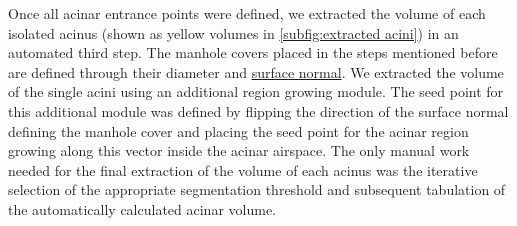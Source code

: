 \documentclass[twoside,paper=a4,abstract=true,english,DIV=calc]{scrartcl}
\begin{document}
Once all acinar entrance points were defined, we extracted the volume of each isolated acinus (shown as yellow volumes in \autoref{subfig:extracted acini}) in an automated third step.
The manhole covers placed in the steps mentioned before are defined through their diameter and \href{https://secure.wikimedia.org/wikipedia/en/w/index.php?title=Surface_normal&oldid=411684319}{surface normal}.
We extracted the volume of the single acini using an additional region growing module.
The seed point for this additional module was defined by flipping the direction of the surface normal defining the manhole cover and placing the seed point for the acinar region growing along this vector inside the acinar airspace.
The only manual work needed for the final extraction of the volume of each acinus was the iterative selection of the appropriate segmentation threshold and subsequent tabulation of the automatically calculated acinar volume.
\end{document}
